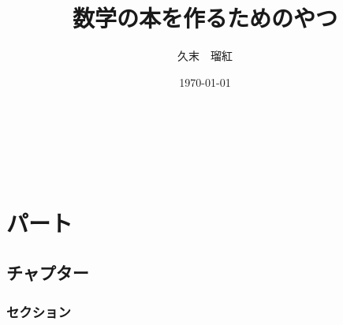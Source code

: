 \documentclass[12pt,a4paper,titlepage]{jbook}
\title{\Huge{数学の本を作るためのやつ}}
\author{久末　瑠紅}
\date{\today}
\begin{document}
\maketitle

\newpage
\thispagestyle{empty}
\,%
\newpage


\tableofcontents

\newpage
\thispagestyle{empty}
\,%
\newpage

\part{パート}
\chapter{チャプター}

\section{セクション}
\end{document}
